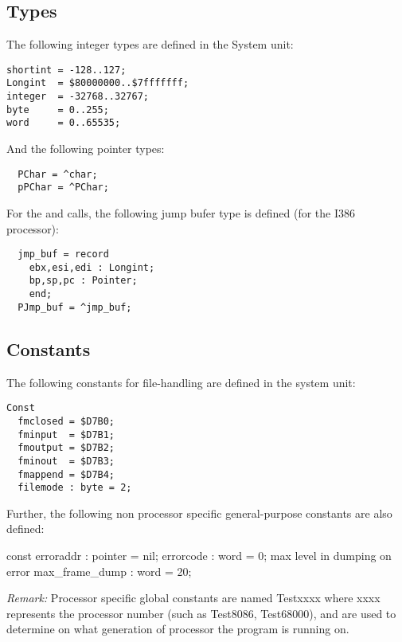 \documentclass{report}
\begin{document}
\subsection{Types}
The following integer types are defined in the System unit:
\begin{verbatim}
shortint = -128..127;
Longint  = $80000000..$7fffffff;
integer  = -32768..32767;
byte     = 0..255;
word     = 0..65535;
\end{verbatim}
And the following pointer types:
\begin{verbatim}
  PChar = ^char;
  pPChar = ^PChar;
\end{verbatim}
For the  and  calls, the following jump bufer
type is defined (for the I386 processor):
\begin{verbatim}
  jmp_buf = record
    ebx,esi,edi : Longint;
    bp,sp,pc : Pointer;
    end;
  PJmp_buf = ^jmp_buf;
\end{verbatim}
\subsection{Constants}
The following constants for file-handling are defined in the system unit:
\begin{verbatim}
Const
  fmclosed = $D7B0;
  fminput  = $D7B1;
  fmoutput = $D7B2;
  fminout  = $D7B3;
  fmappend = $D7B4;
  filemode : byte = 2;
\end{verbatim}
Further, the following non processor specific general-purpose constants
are also defined:
\begin{listing}
const
  erroraddr : pointer = nil;
  errorcode : word = 0;
 { max level in dumping on error }
  max_frame_dump : word = 20;
\end{listing}
\emph{ Remark: } Processor specific global constants are named Testxxxx
where xxxx represents the processor number (such as Test8086, Test68000),
and are used to determine on what generation of processor the program
is running on.
\end{document}
